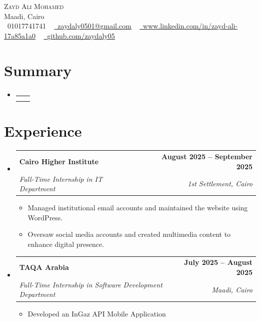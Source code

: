 \documentclass[letterpaper,11pt]{article}
\makeatletter
\newcommand{\resumeItem}[1]{
  \item\small{
    {#1 \vspace{-2pt}}
  }
}
\newcommand{\resumeSubheading}[4]{
  \vspace{-2pt}\item
    \begin{tabular*}{1.0\textwidth}[t]{l@{\extracolsep{\fill}}r}
      \textbf{#1} & \textbf{\small #2} \\
      \textit{\small#3} & \textit{\small #4} \\
    \end{tabular*}\vspace{-7pt}
}
\newcommand{\resumeSubHeadingListStart}{\begin{itemize}[leftmargin=0.0in, label={}]}
\newcommand{\resumeSubHeadingListEnd}{\end{itemize}}
\newcommand{\resumeItemListStart}{\begin{itemize}}
\newcommand{\resumeItemListEnd}{\end{itemize}\vspace{-5pt}}
\makeatother
\begin{document}
\begin{center}
    {\Huge \scshape Zayd Ali Mohamed} \\ \vspace{1pt}
    Maadi, Cairo \\ \vspace{1pt}
    \small \raisebox{-0.1\height}\faPhone\ 01017741741 ~ 
    \href{mailto:zaydaly0501@gmail.com}{\raisebox{-0.2\height}\faEnvelope\ \underline{zaydaly0501@gmail.com}} ~ 
    \href{https://www.linkedin.com/in/zayd-ali-17a85a1a0}{\raisebox{-0.2\height}\faLinkedin\ \underline{www.linkedin.com/in/zayd-ali-17a85a1a0}} ~ 
    \href{https://github.com/zaydaly05}{\raisebox{-0.2\height}\faGithub\ \underline{github.com/zaydaly05}}
    \vspace{-8pt}
\end{center}

\section{Summary}
  \resumeSubHeadingListStart
    \resumeSubheading
      {}{}
      {\parbox{\textwidth}{
        Ambitious Junior Computer Science student with a strong foundation in problem-solving and a passion for technology, consistently advancing technical expertise through hands-on projects and workshops while striving to deliver impactful, scalable software solutions.
      }}{}
  \resumeSubHeadingListEnd

\section{Experience}
  \resumeSubHeadingListStart
    \resumeSubheading
      {Cairo Higher Institute}{August 2025 -- September 2025}
      {Full-Time Internship in IT Department}{1st Settlement, Cairo}
      \resumeItemListStart
        \resumeItem{Managed institutional email accounts and maintained the website using WordPress.}
        \resumeItem{Oversaw social media accounts and created multimedia content to enhance digital presence.}
      \resumeItemListEnd

    \resumeSubheading
      {TAQA Arabia}{July 2025 -- August 2025}
      {Full-Time Internship in Software Development Department}{Maadi, Cairo}
      \resumeItemListStart
        \resumeItem{Developed an InGaz API Mobile Application}
      \resumeItemListEnd
  \resumeSubHeadingListEnd

\end{document}
